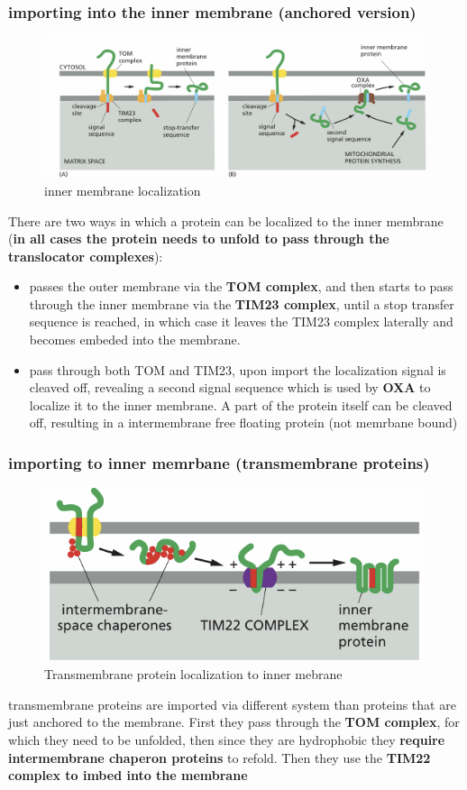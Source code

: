 \documentclass[../main.tex]{subfiles}
\begin{document}
\subsubsection{importing into the inner membrane (anchored version)}
\begin{figure}[H]
    \centering
    \includegraphics[width=\linewidth]{innerMembrane.png}
    \caption{inner membrane localization}
    \label{fig:enter-label}
\end{figure}
There are two ways in which a protein can be localized to the inner membrane (\textbf{in all cases the protein needs to unfold to pass through the translocator complexes}):
\begin{itemize}
    \item passes the outer membrane via the\textbf{ \gls{TOM} complex}, and then starts to pass through the inner membrane via the\textbf{ \gls{TIM23} complex}, until a stop transfer sequence is reached, in which case it leaves the TIM23 complex laterally and becomes embeded into the membrane.

    \item pass through both TOM and TIM23, upon import the localization signal is cleaved off, revealing a second signal sequence which is used by \textbf{\gls{OXA}} to localize it to the inner membrane. A part of the protein itself can be cleaved off, resulting in a intermembrane free floating protein (not memrbane bound)   
\end{itemize}
\subsubsection{importing to inner memrbane (transmembrane proteins)}
\begin{figure}[H]
    \centering
    \includegraphics[width=0.7\linewidth]{transmembraneMitochondria.png}
    \caption{Transmembrane protein localization to inner mebrane}
    \label{fig:enter-label}
\end{figure}
transmembrane proteins are imported via different system than proteins that are just anchored to the membrane. First they pass through the \textbf{\gls{TOM} complex}, for which they need to be unfolded, then since they are hydrophobic they \textbf{require intermembrane chaperon proteins} to refold. Then they use the\textbf{ \gls{TIM22} complex to imbed into the membrane}
\end{document}
